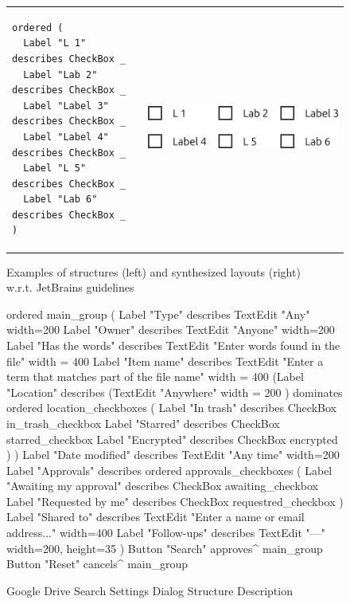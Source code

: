 \begin{figure}
\begin{tabular}{m{85mm}m{6cm}}
      \hline
      \begin{lstlisting}[basicstyle=\small]
ordered (
  Label "L 1"     describes CheckBox _
  Label "Lab 2"   describes CheckBox _
  Label "Label 3" describes CheckBox _
  Label "Label 4" describes CheckBox _
  Label "L 5"     describes CheckBox _
  Label "Lab 6"   describes CheckBox _
)
      \end{lstlisting} &
      \includegraphics[scale=0.4]{Example5-Qt-QML.png} \\
    \end{tabular}
    \caption{Examples of structures (left) and synthesized layouts (right)\\
      w.r.t. JetBrains guidelines}
    \label{fig:evaluation}
  \end{figure}


\begin{figure}[t]
\begin{verbnobox}[\fontsize{10pt}{10pt}\selectfont]
ordered main_group (
  Label "Type" describes TextEdit "Any" {width=200}
  Label "Owner" describes TextEdit "Anyone" {width=200}
  Label "Has the words" describes TextEdit "Enter words found in the file" {
   width = 400
  }
  Label "Item name" describes
    TextEdit "Enter a term that matches part of the file name" {
      width = 400
    }
  (Label "Location" describes
    (TextEdit "Anywhere" { width = 200 }) dominates
    ordered location_checkboxes (
      Label "In trash"  describes CheckBox in_trash_checkbox
      Label "Starred"   describes CheckBox starred_checkbox
      Label "Encrypted" describes CheckBox encrypted
    )
  )
  Label "Date modified" describes  TextEdit "Any time" {width=200}
  Label "Approvals" describes
    ordered approvals_checkboxes (
      Label "Awaiting my approval" describes CheckBox awaiting_checkbox
      Label "Requested by me" describes CheckBox requestred_checkbox
  )
  Label "Shared to" describes
    TextEdit "Enter a name or email address..." {width=400}
  Label "Follow-ups" describes TextEdit "---" {width=200, height=35}
)
Button "Search" approves^ main_group
Button "Reset" cancels^ main_group
\end{verbnobox}
\caption{Google Drive Search Settings Dialog Structure Description}
\label{gd_structure}
\end{figure}

